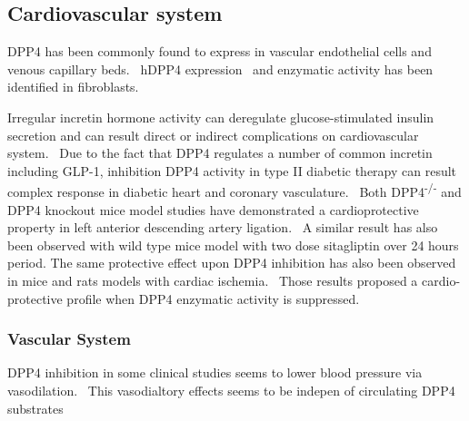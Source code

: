 \subsection{Cardiovascular system}
DPP4 has been commonly found to express in vascular endothelial cells and venous capillary beds.~\cite{Matheeussen2013,Shigeta2012} hDPP4 expression~\cite{Nemoto1999} and enzymatic activity has been identified in fibroblasts.~\cite{Ospelt2010}
\par 
Irregular incretin hormone activity can deregulate glucose-stimulated insulin secretion and can result direct or indirect complications on cardiovascular system.~\cite{Ussher2012} Due to the fact that DPP4 regulates a number of common incretin including GLP-1, inhibition DPP4 activity in type II diabetic therapy can result complex response in diabetic heart and coronary vasculature.~\cite{Ussher2014} Both DPP4\textsuperscript{-/-} and DPP4 knockout mice model studies have demonstrated a cardioprotective property in left anterior descending artery ligation.~\cite{Sauvé2010} A similar result has also been observed with wild type mice model with two dose sitagliptin over 24 hours period. The same protective effect upon DPP4 inhibition has also been observed in mice and rats models with cardiac ischemia.~\cite{Ussher2012} Those results proposed a cardio-protective profile when DPP4 enzymatic activity is suppressed. 
\par 

\subsubsection{Vascular System}
DPP4 inhibition in some clinical studies seems to lower blood pressure via vasodilation.~\cite{Kröller-Schön2012} This vasodialtory effects seems to be indepen of circulating DPP4 substrates 